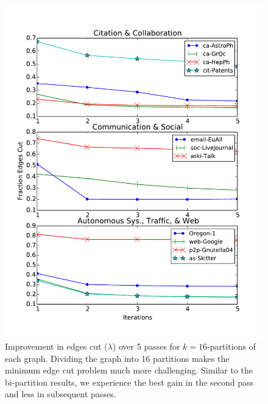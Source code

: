 \begin{figure}[h!]
\centering
\includegraphics[width=0.9\columnwidth] {figures/real_k16_lambda}
\caption[Caption for]{Improvement in edges cut ($\lambda$) over 5 passes for $k=16$-partitions of each graph. Dividing the graph into 16 partitions makes the minimum edge cut problem much more challenging. Similar to the bi-partition results, we experience the best gain in the second pass and less in subsequent passes.}
\label{fig:02}
\end{figure}



